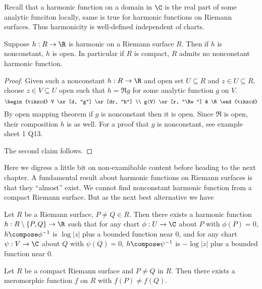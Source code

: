 \documentclass[a4paper]{article}
\begin{document}
Recall that a harmonic function on a domain in \(\C\) is the real part of some analytic funciton locally, same is true for harmonic functions on Riemann surfaces. Thus harmonicity is well-defined independent of charts.

\begin{proposition}
  Suppose \(h: R \to \R\) is harmonic on a Riemann surface \(R\). Then if \(h\) is nonconstant, \(h\) is open. In particular if \(R\) is compact, \(R\) admits no nonconstant harmonic function.
\end{proposition}

\begin{proof}
  Given such a nonconstant \(h: R \to \R\) and open set \(U \subseteq R\) and \(z \in U \subseteq R\), choose \(z \in V \subseteq U\) open such that \(h = \Re g\) for some analytic function \(g\) on \(V\).
  \[
    \begin{tikzcd}
      V \ar[d, "g"] \ar[dr, "h"] \\
      g(V) \ar[r, "\Re"] & \R
    \end{tikzcd}
  \]
  By open mapping theorem if \(g\) is nonconstant then it is open. Since \(\Re\) is open, their composition \(h\) is as well. For a proof that \(g\) is nonconstant, see example sheet 1 Q13.

  The second claim follows.
\end{proof}

Here we digress a little bit on non-examibable content before heading to the next chapter. A fundamental result about harmonic functions on Riemann surfaces is that they ``almost'' exist. We cannot find nonconstant harmonic function from a compact Riemann surface. But as the next best alternative we have

\begin{theorem}
  Let \(R\) be a Riemann surface, \(P \neq Q \in R\). Then there exists a harmonic function \(h: R \setminus \{P, Q\} \to \R\) such that for any chart \(\phi: U \to \C\) about \(P\) with \(\phi(P) = 0\), \(h \compose \phi^{-1}\) is \(\log |z|\) plus a bounded function near \(0\), and for any chart \(\psi: V \to \C\) about \(Q\) with \(\psi(Q) = 0\), \(h \compose \psi^{-1}\) is \(-\log |z|\) plus a bounded function near \(0\).
\end{theorem}


\begin{theorem}
  Let \(R\) be a compact Riemann surface and \(P \neq Q\) in \(R\). Then there exists a meromorphic function \(f\) on \(R\) with \(f(P) \neq f(Q)\).
\end{theorem}
\end{document}
